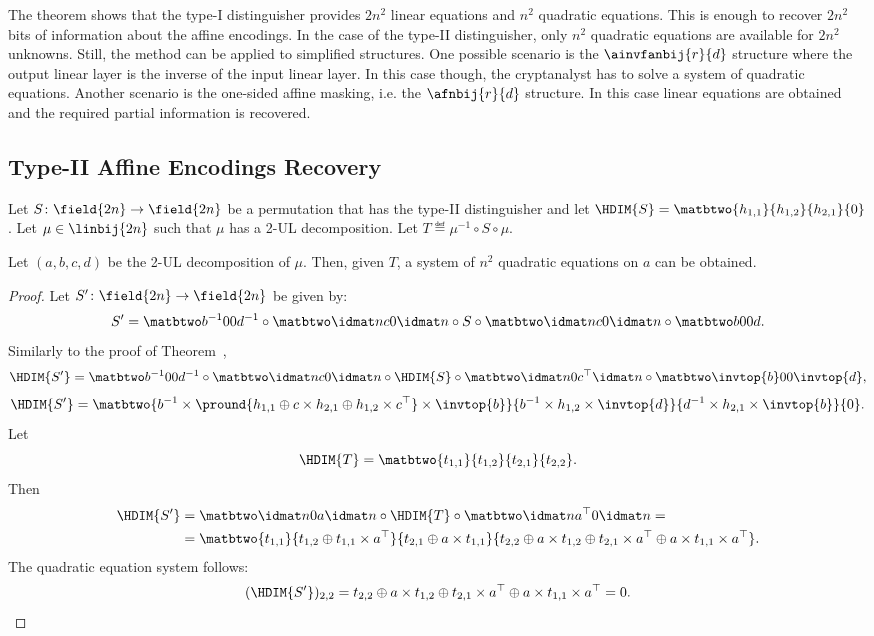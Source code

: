 The theorem shows that the type-I distinguisher provides $2n^2$ linear equations and $n^2$ quadratic equations. This is enough to recover $2n^2$ bits of information about the affine encodings. In the case of the type-II distinguisher, only $n^2$ quadratic equations are available for $2n^2$ unknowns. Still, the method can be applied to simplified structures. One possible scenario is the $\ainvfanbij{r}{d}$ structure where the output linear layer is the inverse of the input linear layer. In this case though, the cryptanalyst has to solve a system of quadratic equations. Another scenario is the one-sided affine masking, i.e. the $\afnbij{r}{d}$ structure. In this case linear equations are obtained and the required partial information is recovered.


\subsection{Type-II Affine Encodings Recovery}

\begin{theorem}
Let $S\colon \field{2n} \to \field{2n}$ be a permutation that has the type-II distinguisher and let $\HDIM{S} = \matbtwo{h_{1,1}}{h_{1,2}}{h_{2,1}}{0}$. Let $\mu \in \linbij{2n}$ such that $\mu$ has a 2-UL decomposition. Let $T \eqdef \mu^{-1} \circ S \circ \mu$.

Let $(a,b,c,d)$ be the 2-UL decomposition of $\mu$.
Then, given $T$, a system of $n^2$ quadratic equations on $a$ can be obtained.
\end{theorem}
\begin{proof}
Let $S'\colon \field{2n}\to \field{2n}$ be given by:
$$
S' = \diag{b^{-1}}{d^{-1}} \compos \idup{c} \compos S \compos \idup{c} \compos \diag{b}{d}.
$$
Similarly to the proof of Theorem~,
$$
\HDIM{S'} = \diag{b^{-1}}{d^{-1}} \compos \idup{c} \compos \HDIM{S} \compos \idlo{c^{\top}} \compos \diag{\invtop{b}}{\invtop{d}},
$$
$$
\HDIM{S'} = \matbtwo{b^{-1}\times \pround{h_{1,1} \oplus c\times h_{2,1} \oplus h_{1,2}\times c^{\top}}\times \invtop{b}}{b^{-1}\times h_{1,2} \times \invtop{d}}{d^{-1}\times h_{2,1} \times \invtop{b}}{0}.
$$
Let
$$
\HDIM{T} = \matbtwo{t_{1,1}}{t_{1,2}}{t_{2,1}}{t_{2,2}}.
$$
Then
\begin{align*}
\HDIM{S'} &= \idlo{a} \compos \HDIM{T} \compos \idup{a^{\top}} = \\
          &= \matbtwo{t_{1,1}}{t_{1,2}\oplus t_{1,1}\times a^{\top}}{t_{2,1}\oplus a \times t_{1,1}}{t_{2,2} \oplus a\times t_{1,2}\oplus t_{2,1}\times a^{\top} \oplus a \times t_{1,1} \times a^{\top}}.
\end{align*}
The quadratic equation system follows:
$$
(\HDIM{S'})_{2,2} = t_{2,2} \oplus a\times t_{1,2}\oplus t_{2,1}\times a^{\top} \oplus a \times t_{1,1} \times a^{\top} = 0.
$$
\end{proof}

